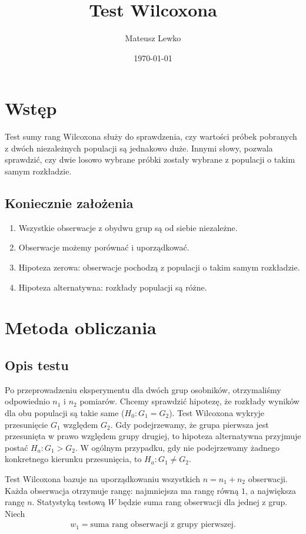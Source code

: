 \documentclass[a4paper]{article}
\title{Test Wilcoxona}
\author{Mateusz Lewko}
\date{\today}
\begin{document}
\maketitle

\section{Wstęp}

 Test sumy rang Wilcoxona służy do sprawdzenia, czy wartości próbek pobranych z dwóch niezależnych populacji są jednakowo duże. Innymi słowy, pozwala sprawdzić, czy dwie losowo wybrane próbki zostały wybrane z populacji o takim samym rozkładzie. 

\subsection{Koniecznie założenia}
\begin{enumerate}
    \item Wszystkie obserwacje z obydwu grup są od siebie niezależne.
    \item Obserwacje możemy porównać i uporządkować.
    \item Hipoteza zerowa: obserwacje pochodzą z populacji o takim samym rozkładzie.
    \item Hipoteza alternatywna: rozkłady populacji są różne.
\end{enumerate}

\section{Metoda obliczania}
\subsection{Opis testu}
Po przeprowadzeniu eksperymentu dla dwóch grup osobników, otrzymaliśmy odpowiednio $n_1$ i $n_2$ pomiarów. Chcemy sprawdzić hipotezę, że rozkłady wyników dla obu populacji są takie same ($H_0 : G_1 = G_2$). Test Wilcoxona wykryje przesunięcie $G_1$ względem $G_2$. Gdy podejrzewamy, że grupa pierwsza jest przesunięta w prawo względem grupy drugiej, to hipoteza alternatywna przyjmuje postać $H_a: G_1 > G_2$. W ogólnym przypadku, gdy nie podejrzewamy żadnego konkretnego kierunku przesunięcia, to  $H_a: G_1 \neq G_2$.

Test Wilcoxona bazuje na uporządkowaniu wszystkich $n = n_1 + n_2$ obserwacji. Każda obserwacja otrzymuje rangę: najmniejsza ma rangę równą $1$, a największa rangę $n$. Statystyką testową $W$ będzie suma rang obserwacji dla jednej z grup. Niech 
\begin{align}
    w_1 = \text{suma rang obserwacji z grupy pierwszej.}
\end{align}
\end{document}
